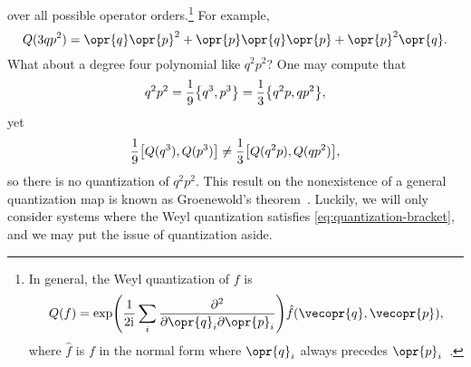 \documentclass[../thesis.tex]{subfiles}
\begin{document}
over all possible operator orders.\footnote{%
  In general, the Weyl quantization of $f$ is
  \begin{equation}
    Q(f)
    = \exp(\frac{1}{2\im}\sum_i \pdv{}{\opr{q}_i}{\opr{p}_i})
    \hat{f}(\vecopr{q}, \vecopr{p}),
  \end{equation}
  where $\hat{f}$ is $f$ in the normal form where $\opr{q}_i$ always precedes
  $\opr{p}_i$~\cite{shewellFormationQuantumMechanicalOperators1959}.
}
For example,
\begin{equation}
  Q(3q p^2)
  = \opr{q}\opr{p}^2 + \opr{p}\opr{q}\opr{p} + \opr{p}^2 \opr{q}.
\end{equation}
What about a degree four polynomial like $q^2 p^2$? One may compute that
\begin{equation}
  q^2 p^2
  = \frac{1}{9}\qty{q^3, p^3}
  = \frac{1}{3}\qty{q^2 p, qp^2},
\end{equation}
yet
\begin{equation}
  \frac{1}{9}\comm{Q(q^3)}{Q(p^3)}
  \ne \frac{1}{3}\comm{Q(q^2 p)}{Q(qp^2)},
\end{equation}
so there is no quantization of $q^2 p^2$. This result on the nonexistence of a
general quantization map is known as Groenewold's
theorem~\cite[p.~272]{hallQuantumTheoryMathematicians2013}. Luckily, we will
only consider systems where the Weyl quantization satisfies
\cref{eq:quantization-bracket}, and we may put the issue of quantization aside.
\end{document}
